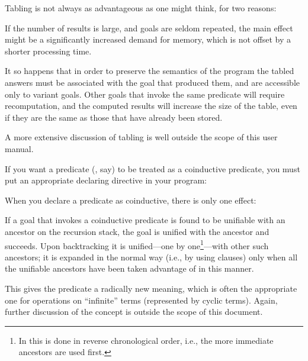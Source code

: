 Tabling is not always as advantageous as one might think, for two reasons:
  \begin{Enumerate}
  \item
    If the number of results is large, and goals are seldom repeated, the
    main effect might be a significantly increased demand for memory, which
    is not offset by a shorter processing time.

  \item It so happens that in order to preserve the semantics of the program
    the tabled answers must be associated with the goal that produced them,
    and are accessible only to variant goals.  Other goals that invoke the
    same predicate will require recomputation, and the computed results will
    increase the size of the table, even if they are the same as those that
    have already been stored.
  \end{Enumerate}


A more extensive discussion of tabling is well outside the scope of this user
manual.



%
%

If you want a predicate (, say) to be treated as a coinductive
predicate, you must put an appropriate declaring directive in your
program:\\
\ind{}\label{dir:coinductive}

When you declare a predicate as coinductive, there is only one effect:
\begin{Itemize}
  \item
    If a goal that invokes a coinductive predicate is found to be unifiable
    with an ancestor on the recursion stack, the goal is unified with the
    ancestor and succeeds.  Upon backtracking it is unified---one by
    one\footnote{
      In  this is done in reverse chronological order, i.e.,
      the more immediate ancestors are used first.
    }---with other such ancestors;
    it is expanded in the normal way (i.e., by
    using clauses) only when all the unifiable ancestors have been taken
    advantage of in this manner.
\end{Itemize}
This gives the predicate a radically new meaning, which is often the
appropriate one for operations on ``infinite'' terms (represented by cyclic
terms).  Again, further discussion of the concept is outside the scope of
this document.
